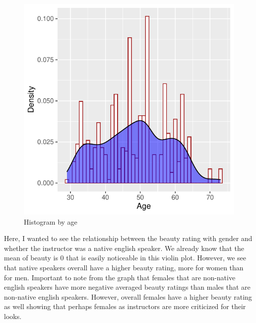 \documentclass[
  12 pt,
]{article}
\begin{document}
\begin{figure}[H]

{\centering \includegraphics{18205420_Markdown--1-_files/figure-latex/histogram-1} 

}

\caption{Histogram by age}\label{fig:histogram}
\end{figure}
\newpage

Here, I wanted to see the relationship between the beauty rating with gender and whether the instructor was a native english speaker. We already know that the mean of beauty is 0 that is easily noticeable in this violin plot. However, we see that native speakers overall have a higher beauty rating, more for women than for men. Important to note from the graph that females that are non-native english speakers have more negative averaged beauty ratings than males that are non-native english speakers. However, overall females have a higher beauty rating as well showing that perhaps females as instructors are more criticized for their looks.
\end{document}
